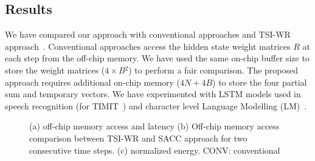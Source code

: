 \documentclass[a4paper,10pt]{article}
\begin{document}
\subsection{Results}
We have compared our approach with conventional approaches and TSI-WR approach~\cite{park2020time}. Conventional approaches access the hidden state weight matrices $R$ at each step from the off-chip memory. We have used the same on-chip buffer size to store the weight matrices ($4{\times}B{^2}$) to perform a fair comparison. The proposed approach requires additional on-chip memory ($4N{+}4B$) to store the four partial sum and temporary vectors.
We have experimented with LSTM models used in speech recognition (for TIMIT~\cite{garofolo1993timit}) and character level Language Modelling (LM)~\cite{sundermeyer2015feedforward}.
\begin{figure}[!htb]
	\centering
	\hfil
	\caption{(a) off-chip memory access and latency (b) Off-chip memory access comparison between TSI-WR and SACC approach for two consecutive time steps. (c) normalized energy. CONV: conventional}	\label{fig:compareMemAccessAndRunTime}
	\vspace{-1.0em}	
\end{figure}
\end{document}
